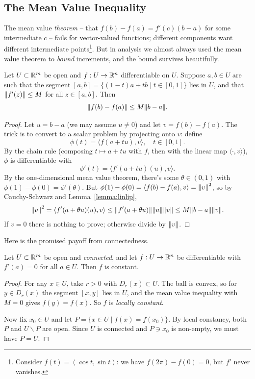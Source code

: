 \documentclass[a4paper]{scrartcl}
\begin{document}
\subsection{The Mean Value Inequality}

The mean value \emph{theorem} -- that $f(b) - f(a) = f'(c)(b - a)$ for some intermediate $c$ -- fails for vector-valued functions; different components want different intermediate points\footnote{Consider $f(t) = (\cos t, \sin t)$: we have $f(2\pi) - f(0) = 0$, but $f'$ never vanishes.}. But in analysis we almost always used the mean value theorem to \emph{bound} increments, and the bound survives beautifully.

\begin{theorem}\label{thm:mvi}
    Let $U \subset \mathbb{R}^m$ be open and $f: U \rightarrow \mathbb{R}^n$ differentiable on $U$. Suppose $a, b \in U$ are such that the segment $[a, b] = \{(1 - t)a + tb \mid t \in [0, 1]\}$ lies in $U$, and that $\norm{f'(z)} \leq M$ for all $z \in [a, b]$. Then
    $$
    \norm{f(b) - f(a)} \leq M\norm{b - a}.
    $$
\end{theorem}
\begin{proof}
    Let $u = b - a$ (we may assume $u \neq 0$) and let $v = f(b) - f(a)$. The trick is to convert to a scalar problem by projecting onto $v$: define
    $$
    \phi(t) = \langle f(a + tu), v\rangle, \quad t \in [0, 1].
    $$
    By the chain rule (composing $t \mapsto a + tu$ with $f$, then with the linear map $\langle \cdot, v \rangle$), $\phi$ is differentiable with
    $$
    \phi'(t) = \langle f'(a + tu)(u), v\rangle.
    $$
    By the one-dimensional mean value theorem, there's some $\theta \in (0, 1)$ with $\phi(1) - \phi(0) = \phi'(\theta)$. But $\phi(1) - \phi(0) = \langle f(b) - f(a), v\rangle = \norm{v}^2$, so by Cauchy-Schwarz and Lemma~\ref{lemma:linlip},
    $$
    \norm{v}^2 = \langle f'(a + \theta u)(u), v\rangle \leq \norm{f'(a + \theta u)}\norm{u}\norm{v} \leq M \norm{b - a} \norm{v}.
    $$
    If $v = 0$ there is nothing to prove; otherwise divide by $\norm{v}$.
\end{proof}

Here is the promised payoff from connectedness.

\begin{corollary}
    Let $U \subset \mathbb{R}^m$ be open and \emph{connected}, and let $f: U \rightarrow \mathbb{R}^n$ be differentiable with $f'(a) = 0$ for all $a \in U$. Then $f$ is constant.
\end{corollary}
\begin{proof}
    For any $x \in U$, take $r > 0$ with $D_r(x) \subset U$. The ball is convex, so for $y \in D_r(x)$ the segment $[x, y]$ lies in $U$, and the mean value inequality with $M = 0$ gives $f(y) = f(x)$. So $f$ is \emph{locally constant}.

    Now fix $x_0 \in U$ and let $P = \{x \in U \mid f(x) = f(x_0)\}$. By local constancy, both $P$ and $U \backslash P$ are open. Since $U$ is connected and $P \ni x_0$ is non-empty, we must have $P = U$.
\end{proof}
\end{document}
